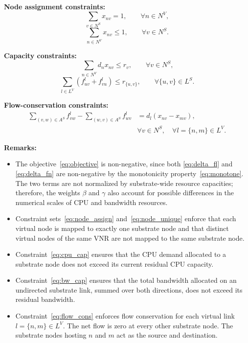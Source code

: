 \documentclass{ieeeaccess}
\begin{document}
\textbf{Node assignment constraints:}
\begin{equation}
	\sum_{v\in N^S}x_{nv}=1,
	\qquad
	\forall n\in N^V,
	\label{eq:node_assign}
\end{equation}
\begin{equation}
	\sum_{n\in N^V}x_{nv}\le1,
	\qquad
	\forall v\in N^S.
	\label{eq:node_unique}
\end{equation}

\textbf{Capacity constraints:}
\begin{equation}
	\sum_{n\in N^V}d_nx_{nv}
	\le r_v,
	\qquad
	\forall v\in N^S,
	\label{eq:cpu_cap}
\end{equation}
\begin{equation}
	\sum_{l\in L^V}
	\left(
	f_{uv}^l+f_{vu}^l
	\right)
	\le r_{\{u,v\}},
	\qquad
	\forall\{u,v\}\in L^S.
	\label{eq:bw_cap}
\end{equation}

\textbf{Flow-conservation constraints:}
\begin{equation}
	\begin{aligned}
		\sum_{(v,w)\in A^S}f_{vw}^l
		-
		\sum_{(w,v)\in A^S}f_{wv}^l
		  & =                      
		d_l\left(x_{nv}-x_{mv}\right),
		\\
		  & \forall v\in N^S,\quad 
		\forall l=\{n,m\}\in L^V.
	\end{aligned}
	\label{eq:flow_cons}
\end{equation}

\textbf{Remarks:}
\begin{itemize}
	\item The objective~\eqref{eq:objective} is non-negative, since both \eqref{eq:delta_fl} and
	      \eqref{eq:delta_fn} are non-negative by the monotonicity property~\eqref{eq:monotone}. The two
	      terms are not normalized by substrate-wide resource capacities; therefore, the weights $\beta$
	      and $\gamma$ also account for possible differences in the numerical scales of CPU and bandwidth
	      resources.
	\item Constraint sets~\eqref{eq:node_assign} and~\eqref{eq:node_unique} enforce that each virtual
	      node is mapped to exactly one substrate node and that distinct virtual nodes of the same VNR are
	      not mapped to the same substrate node.
	\item Constraint~\eqref{eq:cpu_cap} ensures that the CPU demand allocated to a substrate node
	      does not exceed its current residual CPU capacity.
	\item Constraint~\eqref{eq:bw_cap} ensures that the total bandwidth allocated on an undirected
	      substrate link, summed over both directions, does not exceed its residual bandwidth.
	\item Constraint~\eqref{eq:flow_cons} enforces flow conservation for each virtual link
	      $l=\{n,m\}\in L^V$. The net flow is zero at every other substrate node. The substrate nodes
	      hosting $n$ and $m$ act as the source and destination.
\end{itemize}
\end{document}
